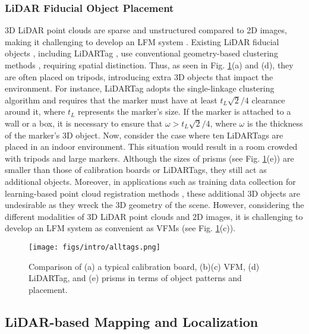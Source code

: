 \subsubsection{LiDAR Fiducial Object Placement}
3D LiDAR point clouds are sparse and unstructured compared to 2D images, making it challenging to develop an LFM system \cite{lt}. Existing LiDAR fiducial objects \cite{cal1,cal2}, including LiDARTag \cite{lt}, use conventional geometry-based clustering methods \cite{edge,single,rangenet}, requiring spatial distinction. 
%
Thus, as seen in Fig. \ref{tags}(a) and (d), they are often placed on tripods, introducing extra 3D objects that impact the environment. 
%
For instance, LiDARTag adopts the single-linkage clustering algorithm \cite{single} and requires that the marker must have at least $t_{L}\sqrt{2}/4$ clearance around it, where $t_{L}$ represents the marker's size. If the marker is attached to a wall or a box, it is necessary to ensure that $\omega > t_{L}\sqrt{2}/4$, where $\omega$ is the thickness of the marker's 3D object. Now, consider the case where ten LiDARTags are placed in an indoor environment. This situation would result in a room crowded with tripods and large markers. 
%
Although the sizes of prisms \cite{station} (see Fig. \ref{tags}(e)) are smaller than those of calibration boards or LiDARTags, they still act as additional objects.
%
Moreover, in applications such as training data collection for learning-based point cloud registration methods \cite{sghr,mdgd}, these additional 3D objects are undesirable as they wreck the 3D geometry of the scene. However, considering the different modalities of 3D LiDAR point clouds and 2D images, it is challenging to develop an LFM system as convenient as VFMs (see Fig. \ref{tags}(c)). 
%
\begin{figure}[H] 
	\centering
	\texttt{[image: figs/intro/alltags.png]}
	\caption{ Comparison of (a) a typical calibration board, (b)(c) VFM, (d) LiDARTag, and (e) prisms in terms of object patterns and placement. 
 }
	\label{tags}
\end{figure}

\subsection{LiDAR-based Mapping and Localization}
